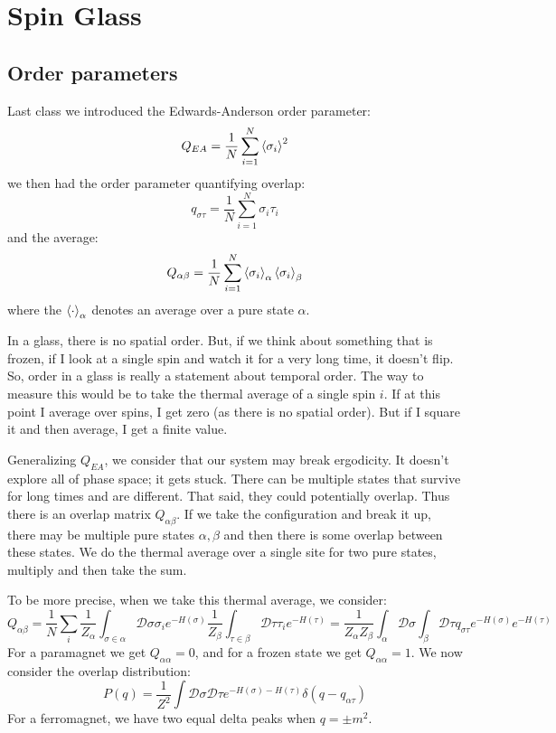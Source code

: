 \section{Spin Glass}

\subsection{Order parameters}
Last class we introduced the Edwards-Anderson order parameter:
\begin{equation}
    Q_{EA} = \frac{1}{N}\sum_{i=1}^N\left< \sigma_i \right>^2
\end{equation}
we then had the order parameter quantifying overlap:
\begin{equation}
    q_{\sigma\tau} = \frac{1}{N}\sum_{i=1}^N \sigma_i\tau_i
\end{equation}
and the average:
\begin{equation}
    Q_{\alpha\beta} = \frac{1}{N}\sum_{i=1}^N \left< \sigma_i \right>_\alpha \left< \sigma_i \right>_\beta
\end{equation}
where the $\left< \cdot \right>_\alpha$ denotes an average over a pure state $\alpha$. 

In a glass, there is no spatial order. But, if we think about something that is frozen, if I look at a single spin and watch it for a very long time, it doesn't flip. So, order in a glass is really a statement about temporal order. The way to measure this would be to take the thermal average of a single spin $i$. If at this point I average over spins, I get zero (as there is no spatial order). But if I square it and then average, I get a finite value.

Generalizing $Q_{EA}$, we consider that our system may break ergodicity. It doesn't explore all of phase space; it gets stuck. There can be multiple states that survive for long times and are different. That said, they could potentially overlap. Thus there is an overlap matrix $Q_{\alpha\beta}$. If we take the configuration and break it up, there may be multiple pure states $\alpha, \beta$ and then there is some overlap between these states. We do the thermal average over a single site for two pure states, multiply and then take the sum.

To be more precise, when we take this thermal average, we consider:
\begin{equation}
    Q_{\alpha\beta} = \frac{1}{N}\sum_i \frac{1}{Z_\alpha}\int_{\sigma \in \alpha}\mathcal{D}\sigma \sigma_i e^{-H(\sigma)}\frac{1}{Z_\beta}\int_{\tau \in \beta} \mathcal{D}\tau \tau_i e^{-H(\tau)} = \frac{1}{Z_\alpha Z_\beta}\int_\alpha \mathcal{D}\sigma\int_{\beta}\mathcal{D}\tau q_{\sigma\tau}e^{-H(\sigma)}e^{-H(\tau)}
\end{equation}
For a paramagnet we get $Q_{\alpha\alpha} = 0$, and for a frozen state we get $Q_{\alpha\alpha}=1$. We now consider the overlap distribution:
\begin{equation}
    P(q) = \frac{1}{Z^2}\int \mathcal{D}\sigma\mathcal{D}\tau e^{-H(\sigma)-H(\tau)}\delta(q - q_{\alpha\tau})
\end{equation}
For a ferromagnet, we have two equal delta peaks when $q = \pm m^2$. 

